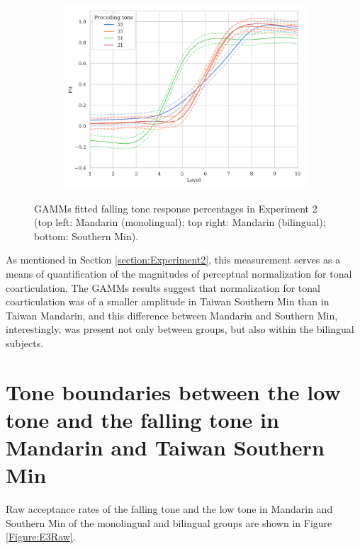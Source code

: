 \begin{figure}[hbt!]
\begin{subfigure}[b]{.45\textwidth}
\includegraphics[width=\textwidth]{figures/E2/Min_GAMM.png}
\end{subfigure}
\caption{GAMMs fitted falling tone response percentages in Experiment 2 (top left: Mandarin (monolingual); top right: Mandarin (bilingual); bottom: Southern Min).}
\label{Figure:E2GAMM}
\end{figure}

As mentioned in Section \ref{section:Experiment2}, this measurement serves as a means of quantification of the magnitudes of perceptual normalization for tonal coarticulation. The GAMMs results suggest that normalization for tonal coarticulation was of a smaller amplitude in Taiwan Southern Min than in Taiwan Mandarin, and this difference between Mandarin and Southern Min, interestingly, was present not only between groups, but also within the bilingual subjects.

\section{Tone boundaries between the low tone and the falling tone in Mandarin and Taiwan Southern Min}

Raw acceptance rates of the falling tone and the low tone in Mandarin and Southern Min of the monolingual and bilingual groups are shown in Figure \ref{Figure:E3Raw}.

